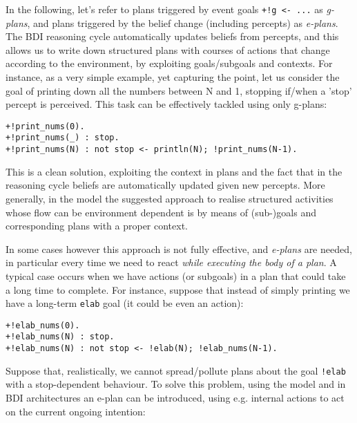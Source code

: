 %
%
%
In the following, let's refer to plans triggered by event goals
\texttt{+!g <- ...} as \emph{g-plans}, and plans triggered by the
belief change (including percepts) as \emph{e-plans}.
%
The BDI reasoning cycle automatically updates beliefs from percepts,
and this allows us to write down structured plans with courses of
actions that change according to the environment, by exploiting
goals/subgoals and contexts.
%
For instance, as a very simple example, yet capturing the point, let us consider the goal of  printing down all the numbers between N and 1, stopping if/when a 'stop' percept is perceived. 
%
This task can be effectively tackled using only g-plans:

\begin{small}
\begin{verbatim}
+!print_nums(0).
+!print_nums(_) : stop.
+!print_nums(N) : not stop <- println(N); !print_nums(N-1).
\end{verbatim}
\end{small}
	
\noindent This is a clean solution, exploiting the context in plans
and the fact that in the reasoning cycle beliefs are automatically
updated given new percepts.
%
More generally, in the {\asl} model the suggested approach to realise
structured activities whose flow can be environment dependent is by
means of (sub-)goals and corresponding plans with a proper context.

In some cases however this approach is not fully effective, and
\emph{e-plans} are needed,
%
in particular every time we need to react \emph{while executing the
  body of a plan}.
%
A typical case occurs when we have actions (or subgoals) in a plan
that could take a long time to complete.
%
For instance, suppose that instead of simply printing we have a
long-term \texttt{elab} goal (it could be even an action):

\begin{small}
\begin{verbatim}
+!elab_nums(0).
+!elab_nums(N) : stop. 
+!elab_nums(N) : not stop <- !elab(N); !elab_nums(N-1).
\end{verbatim}
\end{small}

\noindent Suppose that, realistically, we cannot spread/pollute plans
about the goal \texttt{!elab} with a stop-dependent behaviour.
%
To solve this problem, using the {\asl} model and in BDI architectures
an e-plan can be introduced, using e.g. internal actions to act on the
current ongoing intention:

